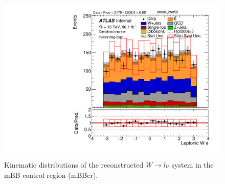 \begin{figure}[!h]
\begin{center}
\includegraphics[scale=0.33]{./figures/boosted/PlotsInMbbCR/DataMC_2tag_0bjet_mbbcr_lepton_presel_met50_WlepPhi}
\caption{Kinematic distributions of the reconstructed $W \to l\nu$ system in the mBB control region (mBBcr).}
\label{fig:boosted_mbbcr_wlep}
\end{center}
\end{figure}
 \newpage
